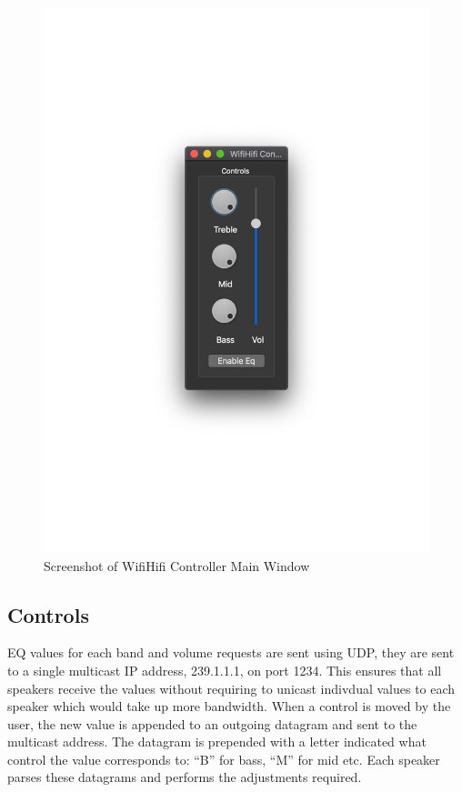\documentclass[main.tex]{subfiles}
\begin{document}
\begin{figure}[H]
    \centering
    \includegraphics[scale=0.6]{./figs/app-screenshot.pdf}        
    \caption{Screenshot of WifiHifi Controller Main Window}
    \label{fig:app-screenshot}
\end{figure}

\subsection{Controls}
EQ values for each band and volume requests are sent using UDP, they are sent to a single multicast IP address, 239.1.1.1, on port 1234.
This ensures that all speakers receive the values without requiring to unicast indivdual values to each speaker which would take up more bandwidth.
When a control is moved by the user, the new value is appended to an outgoing datagram and sent to the multicast address.
The datagram is prepended with a letter indicated what control the value corresponds to: ``B'' for bass, ``M'' for mid etc.
Each speaker parses these datagrams and performs the adjustments required.
\end{document}
